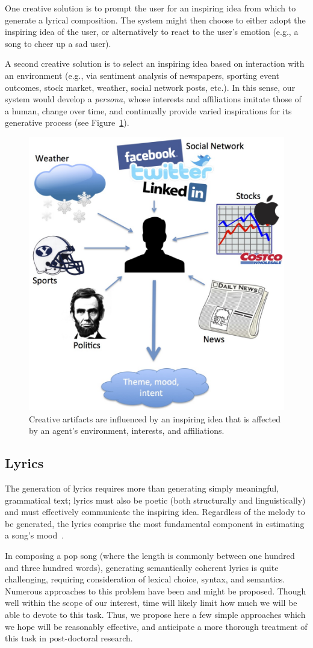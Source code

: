 \documentclass[11pt,phd]{byuprop}
\begin{document}
One creative solution is to prompt the user for an inspiring idea from which to generate a lyrical composition. The system might then choose to either adopt the inspiring idea of the user, or alternatively to react to the user's emotion (e.g., a song to cheer up a sad user). 

A second creative solution is to select an inspiring idea based on interaction with an environment (e.g., via sentiment analysis of newspapers, sporting event outcomes, stock market, weather, social network posts, etc.). In this sense, our system would develop a \emph{persona}, whose interests and affiliations imitate those of a human, change over time, and continually provide varied inspirations for its generative process (see Figure~\ref{fig:inspiring_idea}).

\begin{figure}
  \centering
  \includegraphics[width=.45\textwidth]{graphics/inspiring_idea.jpg}
  \caption{Creative artifacts are influenced by an inspiring idea that is affected by an agent's environment, interests, and affiliations.}
    \label{fig:inspiring_idea}
\end{figure}

\subsection{Lyrics}

The generation of lyrics requires more than generating simply meaningful, grammatical text; lyrics must also be poetic (both structurally and linguistically) and must effectively communicate the inspiring idea. Regardless of the melody to be generated, the lyrics comprise the most fundamental component in estimating a song's mood~\cite{chi2009power}.

In composing a pop song (where the length is commonly between one hundred and three hundred words), generating semantically coherent lyrics is quite challenging, requiring consideration of lexical choice, syntax, and semantics. Numerous approaches to this problem have been and might be proposed. Though well within the scope of our interest, time will likely limit how much we will be able to devote to this task. Thus, we propose here a few simple approaches which we hope will be reasonably effective, and anticipate a more thorough treatment of this task in post-doctoral research.
\end{document}
